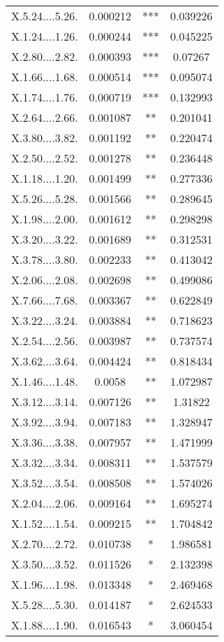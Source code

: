 \documentclass[]{article}
\begin{document}
\begin{longtable}{ c c c c }
X.5.24....5.26. & 0.000212 & *** & 0.039226\\
X.1.24....1.26. & 0.000244 & *** & 0.045225\\
X.2.80....2.82. & 0.000393 & *** & 0.07267\\
X.1.66....1.68. & 0.000514 & *** & 0.095074\\
X.1.74....1.76. & 0.000719 & *** & 0.132993\\
X.2.64....2.66. & 0.001087 & ** & 0.201041\\
X.3.80....3.82. & 0.001192 & ** & 0.220474\\
X.2.50....2.52. & 0.001278 & ** & 0.236448\\
X.1.18....1.20. & 0.001499 & ** & 0.277336\\
X.5.26....5.28. & 0.001566 & ** & 0.289645\\
X.1.98....2.00. & 0.001612 & ** & 0.298298\\
X.3.20....3.22. & 0.001689 & ** & 0.312531\\
X.3.78....3.80. & 0.002233 & ** & 0.413042\\
X.2.06....2.08. & 0.002698 & ** & 0.499086\\
X.7.66....7.68. & 0.003367 & ** & 0.622849\\
X.3.22....3.24. & 0.003884 & ** & 0.718623\\
X.2.54....2.56. & 0.003987 & ** & 0.737574\\
X.3.62....3.64. & 0.004424 & ** & 0.818434\\
X.1.46....1.48. & 0.0058 & ** & 1.072987\\
X.3.12....3.14. & 0.007126 & ** & 1.31822\\
X.3.92....3.94. & 0.007183 & ** & 1.328947\\
X.3.36....3.38. & 0.007957 & ** & 1.471999\\
X.3.32....3.34. & 0.008311 & ** & 1.537579\\
X.3.52....3.54. & 0.008508 & ** & 1.574026\\
X.2.04....2.06. & 0.009164 & ** & 1.695274\\
X.1.52....1.54. & 0.009215 & ** & 1.704842\\
X.2.70....2.72. & 0.010738 & * & 1.986581\\
X.3.50....3.52. & 0.011526 & * & 2.132398\\
X.1.96....1.98. & 0.013348 & * & 2.469468\\
X.5.28....5.30. & 0.014187 & * & 2.624533\\
X.1.88....1.90. & 0.016543 & * & 3.060454\\

\end{longtable}
\end{document}
